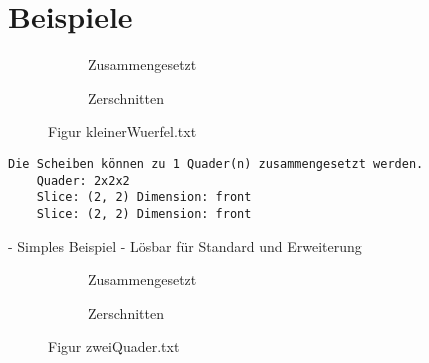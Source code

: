\documentclass[a4paper,10pt,ngerman]{scrartcl}
\newcommand{\simplecube}[8]%
{
    \begin{scope}[shift={#1}]
        \fill[gray!40,canvas is yz plane at x=#2, opacity=#8] (0,0) rectangle (#3,#4);
        \fill[gray!10,canvas is xz plane at y=#3, opacity=#8] (0,0) rectangle (#2,#4);
        \fill[white  ,canvas is xy plane at z=#4, opacity=#8] (0,0) rectangle (#2,#3);
        \foreach\i/\j in {0/1, 1/1, 1/0}
            {
            \draw[line#5] (0,#3*\i,#4*\j) --++ (#2,0,0);
            \draw[line#6] (#2*\i,0,#4*\j) --++ (0,#3,0);
            \draw[line#7] (#2*\i,#3*\j,0) --++ (0,0,#4);
        }
    \end{scope}
}
\newcommand{\smallSquare}[4]%
{
    \begin{scope}[shift={#1}]
        \simplecube{(0,     0,      0)}     {1}{2}{2}   {a}{a}{a}   {1}
        \simplecube{(1+#4,   0,      0))}    {1}{2}{2}   {a}{a}{a}   {1}
    \end{scope}
}
\newcommand{\unsolvedSquare}[4]%
{
    \begin{scope}[shift={#1}]
        \simplecube{(0,     0,      0)}     {1}{2}{2}   {a}{a}{a}   {1}
        \simplecube{(1+#4,   0,      0))}    {1}{2}{2}   {a}{a}{a}   {1}
        \simplecube{(2+2*#4,   0,      0))}    {1}{1}{1}   {a}{a}{a}   {1}
    \end{scope}
}
\begin{document}
    \section{Beispiele}\label{sec:beispiele}

    \begin{figure}[H]
        \centering
        \def\a{3.2}
        \def\b{1.2}
        \begin{subfigure}[b]{0.45\textwidth}
            \centering %
            \caption{Zusammengesetzt}\label{fig:figA2}
        \end{subfigure}
        \begin{subfigure}[b]{0.45\textwidth}
            \centering %
            \caption{Zerschnitten}\label{fig:figB2}
        \end{subfigure}
        \caption{Figur kleinerWuerfel.txt}\label{fig:figAB2}
    \end{figure}

    \begin{lstlisting}[frame=single, title=Programmausgabe kleinerWuerfel.txt, breaklines=true,label={lst:lstlisting3}]
    Die Scheiben können zu 1 Quader(n) zusammengesetzt werden.
    Quader: 2x2x2
    Slice: (2, 2) Dimension: front
    Slice: (2, 2) Dimension: front
    \end{lstlisting}

    - Simples Beispiel
    - Lösbar für Standard und Erweiterung



    \begin{figure}[H]
        \centering
        \def\a{3.2}
        \def\b{1.2}
        \begin{subfigure}[b]{0.45\textwidth}
            \centering %
            \caption{Zusammengesetzt}\label{fig:figA3}
        \end{subfigure}
        \begin{subfigure}[b]{0.45\textwidth}
            \centering %
            \caption{Zerschnitten}\label{fig:figB3}
        \end{subfigure}
        \caption{Figur zweiQuader.txt}\label{fig:figAB3}
    \end{figure}
\end{document}
